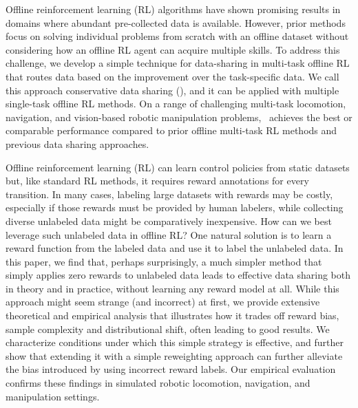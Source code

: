 \documentclass[../thesis.tex]{subfiles}
\begin{document}

Offline reinforcement learning (RL) algorithms have shown promising results in domains where abundant pre-collected data is available. However, prior methods focus on solving individual problems from scratch with an offline dataset without considering how an offline RL agent can acquire multiple skills.  To address this challenge, we develop a simple technique for data-sharing in multi-task offline RL that routes data based on the improvement over the task-specific data. We call this approach conservative data sharing (\cdsmethodname), and it can be applied with multiple single-task offline RL methods. On a range of challenging multi-task locomotion, navigation, and vision-based robotic manipulation problems, \cdsmethodname\ achieves the best or comparable performance compared to prior offline multi-task RL methods and previous data sharing approaches.  

Offline reinforcement learning (RL) can learn control policies from static datasets but, like standard RL methods, it requires reward annotations for every transition. In many cases, labeling large datasets with rewards may be costly, especially if those rewards must be provided by human labelers, while collecting diverse unlabeled data might be comparatively inexpensive. How can we best leverage such unlabeled data in offline RL? One natural solution is to learn a reward function from the labeled data and use it to label the unlabeled data. In this paper, we find that, perhaps surprisingly, a much simpler method that simply applies zero rewards to unlabeled data leads to effective data sharing both in theory and in practice, without learning any reward model at all. While this approach might seem strange (and incorrect) at first, we provide extensive theoretical and empirical analysis that illustrates how it trades off reward bias, sample complexity and distributional shift, often leading to good results. We characterize conditions under which this simple strategy is effective, and further show that extending it with a simple reweighting approach can further alleviate the bias introduced by using incorrect reward labels. Our empirical evaluation confirms these findings in simulated robotic locomotion, navigation, and manipulation settings.
\end{document}
